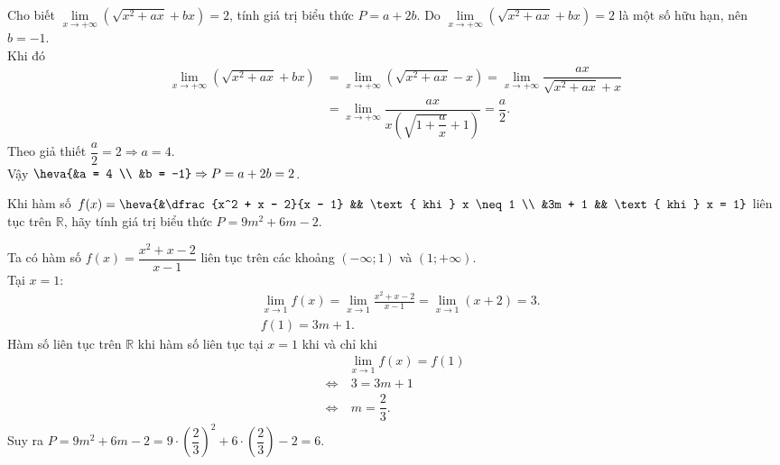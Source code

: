 \begin{ex}%
	Cho biết $\lim\limits_{x \to +\infty} \left( \sqrt{x^2 + ax} + bx \right) = 2$, tính giá trị biểu thức $P = a + 2b$.	
	\loigiai
	{
		Do $\lim\limits_{x \to +\infty} \left( \sqrt{x^2 + ax}  + bx \right) = 2$ là một số hữu hạn, nên $b = -1$.\\
		Khi đó
		\begin{align*}
		\lim\limits_{x \to +\infty} \left( \sqrt{x^2 + ax }+ bx \right) 
		&= \lim\limits_{x \to +\infty} \left( \sqrt{x^2 + ax }- x \right)
		= \lim\limits_{x \to +\infty} \dfrac{ax}{\sqrt{x^2 + ax }+ x} \\
		&= \lim\limits_{x \to +\infty} \dfrac{ax}{x \left( \sqrt{1 + \dfrac{a}{x} }+ 1 \right)}
		= \dfrac{a}{2}.
		\end{align*}
		Theo giả thiết $\dfrac{a}{2} = 2 \Rightarrow a = 4$.\\
		Vậy $\heva{&a = 4 \\ &b = -1} \Rightarrow P = a + 2b = 2$.
	}
\end{ex}
\begin{ex}%
	Khi hàm số $f(x) = \heva{&\dfrac{x^2 + x - 2}{x - 1} && \text{ khi } x \neq 1 \\ &3m + 1 && \text{ khi } x = 1}$ liên tục trên $\mathbb{R}$, hãy tính giá trị biểu thức $P = 9m^2 + 6m - 2$.
	
	\loigiai
	{
		Ta có hàm số $f(x) = \dfrac{x^2 + x - 2}{x - 1}$ liên tục trên các khoảng $(-\infty; 1)$ và $(1; +\infty)$.\\
		Tại $x = 1$:
		\begin{align*}
			&\lim_{x \to 1} f(x) = \lim_{x \to 1} \frac{x^2 + x - 2}{x - 1} = \lim_{x \to 1} (x + 2) = 3.\\
			&f(1) = 3m + 1.
		\end{align*}
		Hàm số liên tục trên $\mathbb{R}$ khi hàm số liên tục tại $x = 1$ khi và chỉ khi
		\begin{align*}
			&\lim\limits_{x \to 1} f(x) = f(1) \\
			\Leftrightarrow &\ 3 = 3m + 1\\
			\Leftrightarrow &\ m = \dfrac{2}{3}.
		\end{align*}
		Suy ra $P = 9m^2 + 6m - 2 = 9 \cdot \left( \dfrac{2}{3} \right)^2 + 6 \cdot \left( \dfrac{2}{3} \right) - 2 = 6$.
	}
\end{ex}
